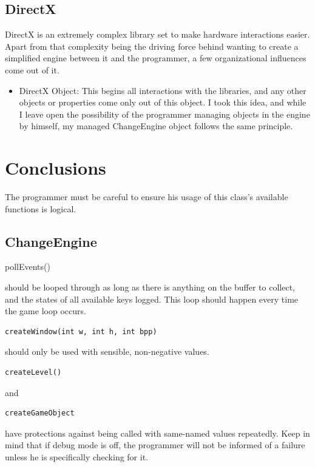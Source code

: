\documentclass[12pt]{article}
\begin{document}
\subsection{DirectX}
DirectX is an extremely complex library set to make hardware interactions easier. Apart from that complexity being the driving force behind wanting to create a simplified engine between it and the programmer, a few organizational influences come out of it.

\begin{itemize}
 \item DirectX Object: This begins all interactions with the libraries, and any other objects or properties come only out of this object. I took this idea, and while I leave open the possibility of the programmer managing objects in the engine by himself, my managed ChangeEngine object follows the same principle.
\end{itemize}


  \section{Conclusions}
    The programmer must be careful to ensure his usage of this class's available functions is logical.
\subsection{ChangeEngine}
\begin{verbatim*}pollEvents()\end{verbatim*} should be looped through as long as there is anything on the buffer to collect, and the states of all available keys logged. This loop should happen every time the game loop occurs.
\\

\begin{verbatim}createWindow(int w, int h, int bpp)\end{verbatim} should only be used with sensible, non-negative values.
\\

\begin{verbatim}createLevel()\end{verbatim} and \begin{verbatim}createGameObject\end{verbatim} have protections against being called with same-named values repeatedly. Keep in mind that if debug mode is off, the programmer will not be informed of a failure unless he is specifically checking for it.
\\
\end{document}
